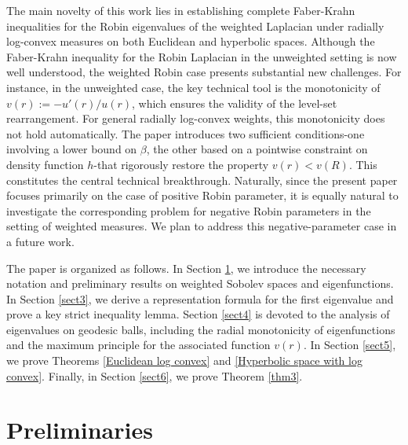 \documentclass[11pt,leqno]{amsart}
\numberwithin{equation}{section}
\begin{document}
The main novelty of this work lies in establishing  complete Faber-Krahn inequalities for the Robin eigenvalues of the weighted Laplacian under radially log-convex measures on both Euclidean and hyperbolic spaces. Although the Faber-Krahn inequality for the Robin Laplacian in the unweighted setting is now well understood, the weighted Robin case presents substantial new challenges. For instance, in the unweighted case, the key technical tool is the monotonicity of 
$v(r):=-u'(r)/u(r)$, which ensures the validity of the level-set rearrangement. For general radially log-convex weights, this monotonicity does not hold automatically. The paper introduces two sufficient conditions-one involving a lower bound  on $\beta$, the other based on a pointwise  constraint on density function $h$-that rigorously restore the property 
$v(r)<v(R)$. This constitutes the central technical breakthrough. Naturally, since the present paper focuses primarily on the case of positive Robin parameter, it is equally natural to investigate the corresponding problem for negative Robin parameters in the setting of weighted measures. We plan to address this negative-parameter case in a future work.






The paper is organized as follows. In Section \ref{sect2}, we introduce the necessary notation and preliminary results on weighted Sobolev spaces and eigenfunctions. In Section \ref{sect3}, we derive a representation formula for the first eigenvalue and prove a key strict inequality lemma. Section \ref{sect4} is devoted to the analysis of eigenvalues on geodesic balls, including the radial monotonicity of eigenfunctions and the maximum principle for the associated function $v(r)$. In Section \ref{sect5}, we prove Theorems \ref{Euclidean log convex} and \ref{Hyperbolic space with log convex}. Finally, in Section \ref{sect6}, we prove Theorem \ref{thm3}.


\section{Preliminaries}\label{sect2}
\end{document}
